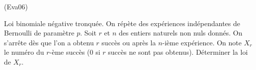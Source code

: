 \begin{tiny}(Eva06)\end{tiny} Loi binomiale négative tronquée.\newline
On répète des expériences indépendantes de Bernoulli de paramètre $p$. Soit $r$ et $n$ des entiers naturels non nuls donnés. On s'arrête dès que l'on a obtenu $r$ succès ou après la $n$-ième expérience. On note $X_r$ le numéro du $r$-ème succès ($0$ si $r$ succès ne sont pas obtenus). Déterminer la loi de $X_r$.

